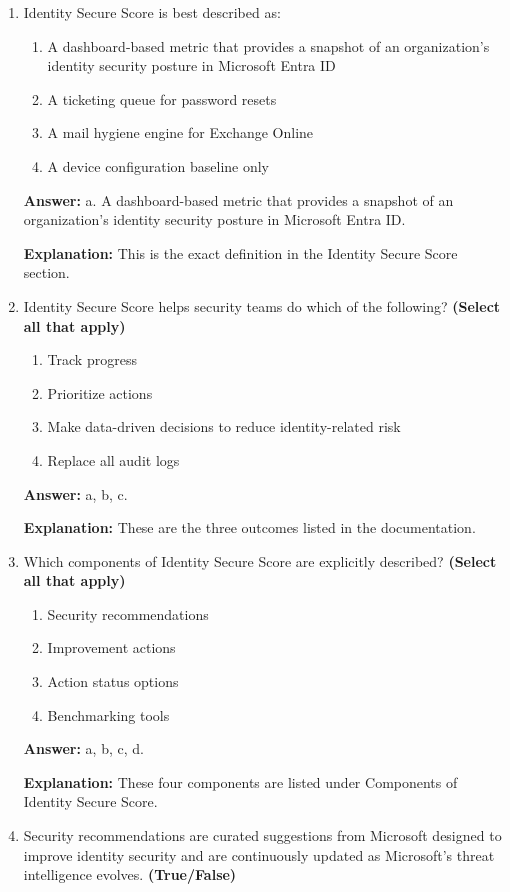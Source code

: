 \documentclass[10pt]{article}
\begin{document}
\begin{enumerate}[leftmargin=*]
\item Identity Secure Score is best described as:
\begin{enumerate}[label=\alph*., leftmargin=1.5em]
\item A dashboard-based metric that provides a snapshot of an organization’s identity security posture in Microsoft Entra ID
\item A ticketing queue for password resets
\item A mail hygiene engine for Exchange Online
\item A device configuration baseline only
\end{enumerate}
\textbf{Answer:} a. A dashboard-based metric that provides a snapshot of an organization’s identity security posture in Microsoft Entra ID.

\textbf{Explanation:} This is the exact definition in the Identity Secure Score section.

\item Identity Secure Score helps security teams do which of the following? \textbf{(Select all that apply)}
\begin{enumerate}[label=\alph*., leftmargin=1.5em]
\item Track progress
\item Prioritize actions
\item Make data-driven decisions to reduce identity-related risk
\item Replace all audit logs
\end{enumerate}
\textbf{Answer:} a, b, c.

\textbf{Explanation:} These are the three outcomes listed in the documentation.

\item Which components of Identity Secure Score are explicitly described? \textbf{(Select all that apply)}
\begin{enumerate}[label=\alph*., leftmargin=1.5em]
\item Security recommendations
\item Improvement actions
\item Action status options
\item Benchmarking tools
\end{enumerate}
\textbf{Answer:} a, b, c, d.

\textbf{Explanation:} These four components are listed under Components of Identity Secure Score.

\item Security recommendations are curated suggestions from Microsoft designed to improve identity security and are continuously updated as Microsoft’s threat intelligence evolves. \textbf{(True/False)}


\end{enumerate}
\end{document}
